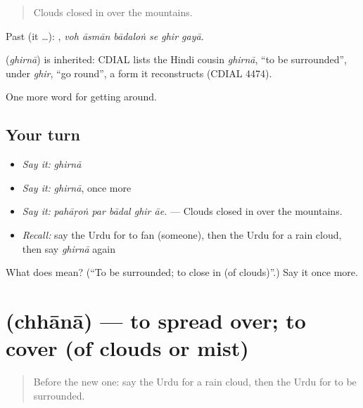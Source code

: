 \begin{quote}
Clouds closed in over the mountains.
\end{quote}

Past (it …):      , \emph{voh āsmān bādaloṅ se ghir gayā}.

\begin{cousinweb}
\textbf{} (\emph{ghirnā}) is inherited: CDIAL lists the Hindi cousin \emph{ghirnā}, \textquotedblleft{}to be surrounded\textquotedblright{}, under \emph{ghir}, \textquotedblleft{}go round\textquotedblright{}, a form it reconstructs (CDIAL 4474).
\end{cousinweb}

\begin{grammarlens}[title={What you've built}]
One more word for getting around.
\end{grammarlens}

\subsection*{Your turn}
\begin{itemize}
\raggedright
  \item \emph{Say it:} \emph{ghirnā}
  \item \emph{Say it:} \emph{ghirnā}, once more
  \item \emph{Say it:} \emph{pahāṛoṅ par bādal ghir āe.} — Clouds closed in over the mountains.
  \item \emph{Recall:} say the Urdu for to fan (someone), then the Urdu for a rain cloud, then say \emph{ghirnā} again
\end{itemize}

\begin{tcolorbox}[breakable,colback=teal!4,colframe=teal!35!black,title={Before you move on}]
What does  mean? (\textquotedblleft{}To be surrounded; to close in (of clouds)\textquotedblright{}.) Say it once more.
\end{tcolorbox}
\section[\texorpdfstring{\ur{چھانا} (chhānā)}{چھانا (chhānā)}]{ (chhānā) — to spread over; to cover (of clouds or mist)}

\label{lesson:UR-C431-chhana}



\begin{quote}
Before the new one: say the Urdu for a rain cloud, then the Urdu for to be surrounded.
\end{quote}

